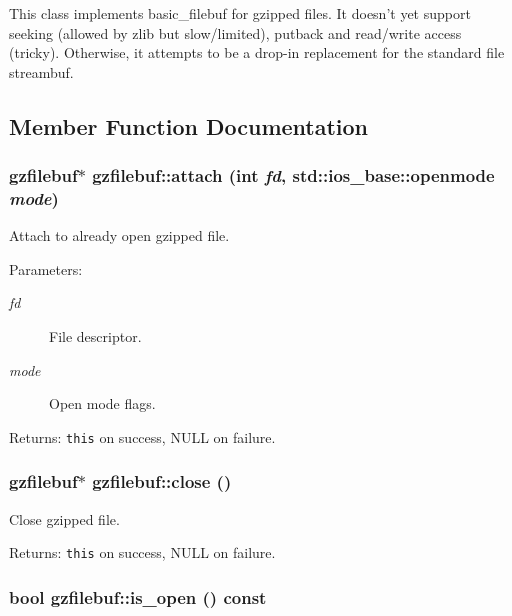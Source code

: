 This class implements basic\_\-filebuf for gzipped files. It doesn't yet support seeking (allowed by zlib but slow/limited), putback and read/write access (tricky). Otherwise, it attempts to be a drop-in replacement for the standard file streambuf. 



\subsection{Member Function Documentation}
\subsubsection{\setlength{\rightskip}{0pt plus 5cm}\bf{gzfilebuf}$\ast$ gzfilebuf::attach (int {\em fd}, std::ios\_\-base::openmode {\em mode})}\label{classgzfilebuf_4d107ba4f23910b6e1cde167952cc720}


Attach to already open gzipped file. 

\begin{Desc}
\item[Parameters:]
\begin{description}
\item[{\em fd}]File descriptor. \item[{\em mode}]Open mode flags. \end{description}
\end{Desc}
\begin{Desc}
\item[Returns:]{\tt this} on success, NULL on failure. \end{Desc}
\subsubsection{\setlength{\rightskip}{0pt plus 5cm}\bf{gzfilebuf}$\ast$ gzfilebuf::close ()}\label{classgzfilebuf_faaae237cb41538c90404653f620bfce}


Close gzipped file. 

\begin{Desc}
\item[Returns:]{\tt this} on success, NULL on failure. \end{Desc}
\subsubsection{\setlength{\rightskip}{0pt plus 5cm}bool gzfilebuf::is\_\-open () const\hspace{0.3cm}{\tt  [inline]}}\label{classgzfilebuf_4de6e9626000c156ce4d3f09cfd1c685}


